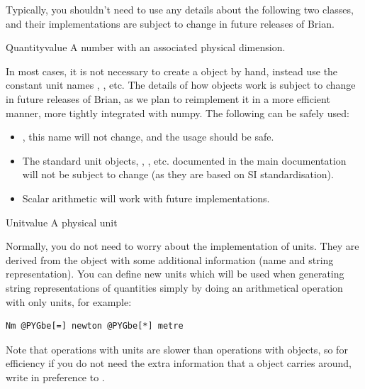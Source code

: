 \documentclass[letterpaper,10pt]{manual}
\begin{document}
Typically, you shouldn't need to use any details about the following
two classes, and their implementations are subject to change in
future releases of Brian.


\hypertarget{brian.Quantity}{}\begin{classdesc}{Quantity}{value}
A number with an associated physical dimension.

In most cases, it is not necessary to create a \hyperlink{brian.Quantity}{} object
by hand, instead use the constant unit names , ,
etc. The details of how \hyperlink{brian.Quantity}{} objects work is subject to
change in future releases of Brian, as we plan to reimplement it
in a more efficient manner, more tightly integrated with numpy. The
following can be safely used:
\begin{itemize}
\item {} 
\hyperlink{brian.Quantity}{}, this name will not change, and the usage
 should be safe.

\item {} 
The standard unit objects, , , etc.
documented in the main documentation will not be subject
to change (as they are based on SI standardisation).

\item {} 
Scalar arithmetic will work with future implementations.

\end{itemize}
\end{classdesc}


\hypertarget{brian.Unit}{}\begin{classdesc}{Unit}{value}
A physical unit

Normally, you do not need to worry about the implementation of
units. They are derived from the \hyperlink{brian.Quantity}{} object with
some additional information (name and string representation).
You can define new units which will be used when generating
string representations of quantities simply by doing an
arithmetical operation with only units, for example:

\begin{Verbatim}[commandchars=@\[\]]
Nm @PYGbe[=] newton @PYGbe[*] metre
\end{Verbatim}

Note that operations with units are slower than operations with
\hyperlink{brian.Quantity}{} objects, so for efficiency if you do not need the
extra information that a \hyperlink{brian.Unit}{} object carries around, write
 in preference to .
\end{classdesc}
\resetcurrentobjects
{}
\end{document}
